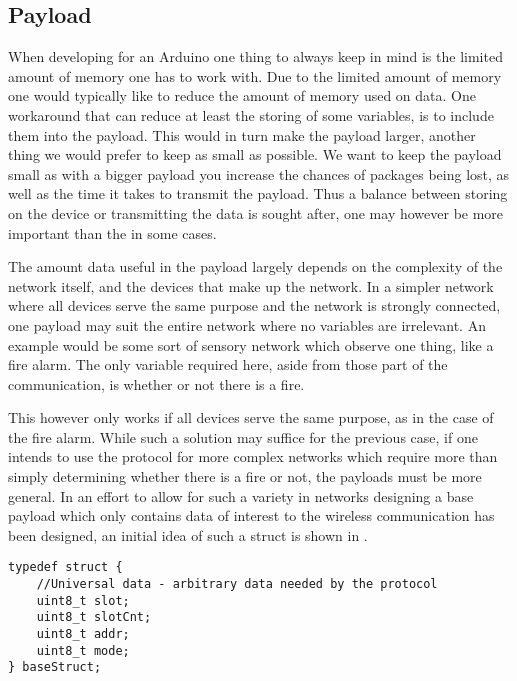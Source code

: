 \subsection{Payload}
When developing for an Arduino one thing to always keep in mind is the limited amount of memory one has to work with.
Due to the limited amount of memory one would typically like to reduce the amount of memory used on data.
One workaround that can reduce at least the storing of some variables, is to include them into the payload.
This would in turn make the payload larger, another thing we would prefer to keep as small as possible.
We want to keep the payload small as with a bigger payload you increase the chances of packages being lost, as well as the time it takes to transmit the payload. 
Thus a balance between storing on the device or transmitting the data is sought after, one may however be more important than the in some cases.

\bigskip \noindent
The amount data useful in the payload largely depends on the complexity of the network itself, and the devices that make up the network.
In a simpler network where all devices serve the same purpose and the network is strongly connected, one payload may suit the entire network where no variables are irrelevant.
An example would be some sort of sensory network which observe one thing, like a fire alarm.
The only variable required here, aside from those part of the communication, is whether or not there is a fire.

This however only works if all devices serve the same purpose, as in the case of the fire alarm.
While such a solution may suffice for the previous case, if one intends to use the protocol for more complex networks which require more than simply determining whether there is a fire or not, the payloads must be more general.
In an effort to allow for such a variety in networks designing a base payload which only contains data of interest to the wireless communication has been designed, an initial idea of such a struct is shown in .

\bigskip \noindent
\lstset{style=customc}
\begin{lstlisting}[caption={Possible way the baseStruct could look for the payload},frame=tlrb,label={baseStruct},numbers=none]
typedef struct {
    //Universal data - arbitrary data needed by the protocol
    uint8_t slot;
    uint8_t slotCnt;
    uint8_t addr;
    uint8_t mode;
} baseStruct;
\end{lstlisting}
\bigskip \noindent

